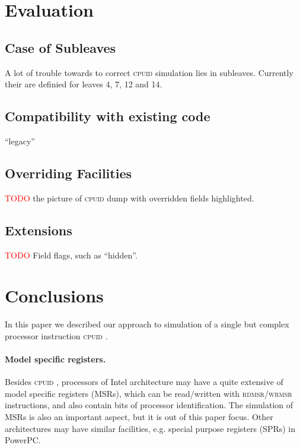 \documentclass[a4paper,10pt,oneside,unicode]{article}
\newcommand{\cpuid}{\textsc{cpuid} }
\newcommand{\todo}[1][]{\textcolor{red}{TODO #1}}
\begin{document}
\section{Evaluation}\label{sec:evaluation}

\subsection{Case of Subleaves}

A lot of trouble towards to correct \cpuid simulation lies in subleaves. Currently their are definied for leaves 4, 7, 12 and 14.


\subsection{Compatibility with existing code}

“legacy” 

\subsection{Overriding Facilities}

\todo the picture of \cpuid dump with overridden fields highlighted.

\subsection{Extensions}

\todo Field flags, such as “hidden”.

\section{Conclusions}\label{sec:conclusions}

In this paper we described our approach to simulation of a single but complex processor instruction \cpuid. 

\paragraph{Model specific registers.} Besides \cpuid, processors of Intel architecture may have a quite extensive of model specific registers (MSRs), which can be read/written with \textsc{rdmsr/wrmsr} instructions, and also contain bits of processor identification. The simulation of MSRs is also an important aspect, but it is out of this paper focus. Other architectures may have similar facilities, e.g. special purpose registers (SPRs) in PowerPC. 




\end{document}
